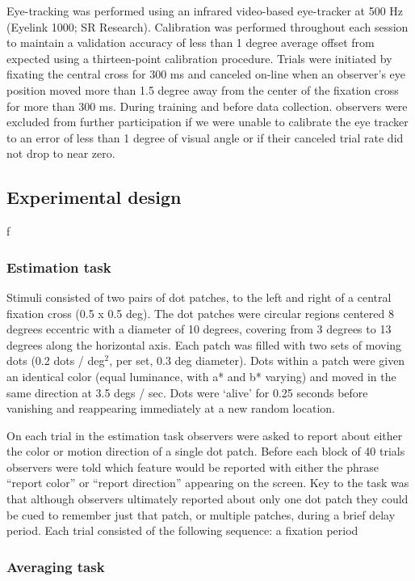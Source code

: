 Eye-tracking was performed using an infrared video-based eye-tracker at 500 Hz (Eyelink 1000; SR Research). Calibration was performed throughout each session to maintain a validation accuracy of less than 1 degree average offset from expected using a thirteen-point calibration procedure. Trials were initiated by fixating the central cross for 300 ms and canceled on-line when an observer’s eye position moved more than 1.5 degree away from the center of the fixation cross for more than 300 ms. During training and before data collection. observers were excluded from further participation if we were unable to calibrate the eye tracker to an error of less than 1 degree of visual angle or if their canceled trial rate did not drop to near zero.

\subsection{Experimental design}
f
\subsubsection{Estimation task}

Stimuli consisted of two pairs of dot patches, to the left and right of a central fixation cross (0.5 x 0.5 deg). The dot patches were circular regions centered 8 degrees eccentric with a diameter of 10 degrees, covering from 3 degrees to 13 degrees along the horizontal axis. Each patch was filled with two sets of moving dots (0.2 dots / deg$^2$, per set, 0.3 deg diameter). Dots within a patch were given an identical color (equal luminance, with a* and b* varying) and moved in the same direction at 3.5 degs / sec. Dots were `alive' for 0.25 seconds before vanishing and reappearing immediately at a new random location.

On each trial in the estimation task observers were asked to report about either the color or motion direction of a single dot patch. Before each block of 40 trials observers were told which feature would be reported with either the phrase ``report color'' or ``report direction'' appearing on the screen. Key to the task was that although observers ultimately reported about only one dot patch they could be cued to remember just that patch, or multiple patches, during a brief delay period. Each trial consisted of the following sequence: a fixation period

\subsubsection{Averaging task}

